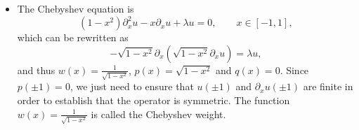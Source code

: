 \begin{itemize}
    \item The Chebyshev equation is 
    \begin{equation}
        (1-x^2)\partial_x^2 u - x\partial_x u + \lambda u = 0,\qquad x\in[-1,1],
    \end{equation}
    which can be rewritten as 
    \begin{equation*}
        -\sqrt{1-x^2}\partial_x (\sqrt{1-x^2}\partial_x u) = \lambda u,
    \end{equation*}
    and thus $w(x)=\frac{1}{\sqrt{1-x^2}}$, $p(x)=\sqrt{1-x^2}$ and $q(x)=0$. Since $p(\pm 1) = 0$, we just need to ensure that $u(\pm 1)$ and $\partial_x u(\pm 1)$ are finite in order to establish that the operator is symmetric. The function $w(x)=\frac{1}{\sqrt{1-x^2}}$ is called the Chebyshev weight. 
\end{itemize}


